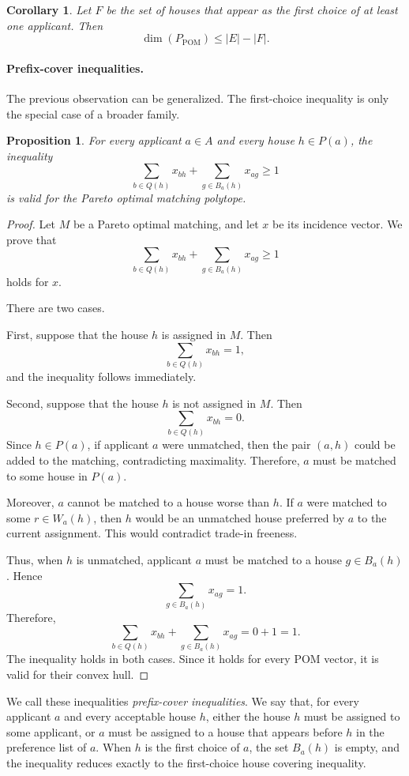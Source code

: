 \documentclass[12pt]{report}
\newtheorem{pprop}[base]{Proposition}
\newtheorem{ccor}[base]{Corollary}
\numberwithin{algorithm}{chapter}
\begin{document}
	\begin{ccor}
		Let $F$ be the set of houses that appear as the first choice of at least one
		applicant. Then
		\[
		\dim(P_{\mathrm{POM}})\le |E|-|F|.
		\]
	\end{ccor}
	
	\paragraph{Prefix-cover inequalities.} The previous observation can be generalized. The first-choice inequality is only the special case of a broader family.
	\begin{pprop}
		For every applicant $a\in A$ and every house $h\in P(a)$, the inequality
		\[
		\sum_{b\in Q(h)}x_{bh}
		+
		\sum_{g\in B_a(h)}x_{ag}
		\ge 1
		\]
		is valid for the Pareto optimal matching polytope.
	\end{pprop}
	
	\begin{proof}
		Let $M$ be a Pareto optimal matching, and let $x$ be its incidence vector. We prove that
		\[
		\sum_{b\in Q(h)}x_{bh}
		+
		\sum_{g\in B_a(h)}x_{ag}
		\ge 1
		\]
		holds for $x$.
		
		There are two cases.
		
		First, suppose that the house $h$ is assigned in $M$. Then
		\[
		\sum_{b\in Q(h)}x_{bh}=1,
		\]
		and the inequality follows immediately.
		
		Second, suppose that the house $h$ is not assigned in $M$. Then
		\[
		\sum_{b\in Q(h)}x_{bh}=0.
		\]
		Since $h\in P(a)$, if applicant $a$ were unmatched, then the pair $(a,h)$ could be added to the matching, contradicting maximality. Therefore, $a$ must be matched to some house in $P(a)$.
		
		Moreover, $a$ cannot be matched to a house worse than $h$. If $a$ were matched to some $r\in W_a(h)$, then $h$ would be an unmatched house preferred by $a$ to the current assignment. This would contradict trade-in freeness.
		
		Thus, when $h$ is unmatched, applicant $a$ must be matched to a house $g\in B_a(h)$. Hence
		\[
		\sum_{g\in B_a(h)}x_{ag}=1.
		\]
		Therefore,
		\[
		\sum_{b\in Q(h)}x_{bh}
		+
		\sum_{g\in B_a(h)}x_{ag}
		=
		0+1
		=
		1.
		\]
		The inequality holds in both cases. Since it holds for every POM vector, it is valid for their convex hull.
	\end{proof}
	
	We call these inequalities \emph{prefix-cover inequalities}. We say that, for every applicant $a$ and every acceptable house $h$, either the house $h$ must be assigned to some applicant, or $a$ must be assigned to a house that appears before $h$ in the preference list of $a$. When $h$ is the first choice of $a$, the set $B_a(h)$ is empty, and the inequality reduces exactly to the first-choice house covering inequality. 
	
\end{document}
